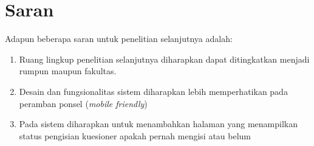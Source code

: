 \section{Saran}
Adapun beberapa saran untuk penelitian selanjutnya adalah:
\begin{enumerate}
	
	\item Ruang lingkup penelitian selanjutnya diharapkan dapat ditingkatkan menjadi rumpun maupun fakultas. 
	
	\item Desain dan fungsionalitas sistem diharapkan lebih memperhatikan pada peramban ponsel (\textit{mobile friendly})
	
	\item Pada sistem diharapkan untuk menambahkan halaman yang menampilkan status pengisian kuesioner apakah pernah mengisi atau belum
	
	
\end{enumerate}


\begin{comment}

\end{comment}